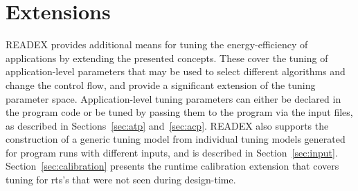 \section{Extensions} \label{sec:extensions}

READEX provides additional means for tuning the energy-efficiency of applications by extending the presented concepts. These cover the tuning of application-level parameters that may be used to select different algorithms and change the control flow, and provide a significant extension of the tuning parameter space. Application-level tuning parameters can either be declared in the program code or be tuned by passing them to the program via the input files, as described in Sections~\ref{sec:atp} and~\ref{sec:acp}. READEX also supports the construction of a generic tuning model from individual tuning models generated for program runs with different inputs, and is described in Section~\ref{sec:input}. Section~\ref{sec:calibration} presents the runtime calibration extension that covers tuning for rts's that were not seen during design-time. 


